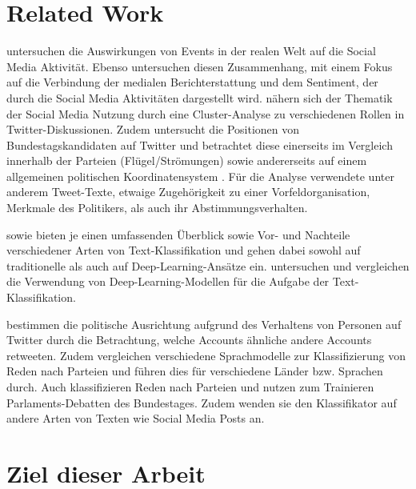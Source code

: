 \section{Related Work}

\textcite{kalyanam_prediction_2016} untersuchen die Auswirkungen von Events in der realen Welt auf die Social Media Aktivität. Ebenso untersuchen \textcite{tsytsarau_dynamics_2014} diesen Zusammenhang, mit einem Fokus auf die Verbindung der medialen Berichterstattung und dem Sentiment, der durch die Social Media Aktivitäten dargestellt wird.
\textcite{gimpel_user_2018} nähern sich der Thematik der Social Media Nutzung durch eine Cluster-Analyse zu verschiedenen Rollen in Twitter-Diskussionen.
Zudem untersucht \textcite{saltzer_bundestagswahl_2022} die Positionen von Bundestagskandidaten auf Twitter und betrachtet diese einerseits im Vergleich innerhalb der Parteien (Flügel/Strömungen) sowie andererseits auf einem allgemeinen politischen Koordinatensystem \autocite{saltzer_bundestagswahl_2022, saltzer_finding_2022}. Für die Analyse verwendete \textcite{saltzer_finding_2022} unter anderem Tweet-Texte, etwaige Zugehörigkeit zu einer Vorfeldorganisation, Merkmale des Politikers, als auch ihr Abstimmungsverhalten.

\textcite{li_survey_2021} sowie \textcite{kowsari_text_2019} bieten je einen umfassenden Überblick sowie Vor- und Nachteile verschiedener Arten von Text-Klassifikation und gehen dabei sowohl auf traditionelle als auch auf Deep-Learning-Ansätze ein.
\textcite{minaee_deep_2022} untersuchen und vergleichen die Verwendung von Deep-Learning-Modellen für die Aufgabe der Text-Klassifikation.

\textcite{wong_quantifying_2016} bestimmen die politische Ausrichtung aufgrund des Verhaltens von Personen auf Twitter durch die Betrachtung, welche Accounts ähnliche andere Accounts retweeten.
Zudem vergleichen \textcite{doan_using_2022} verschiedene Sprachmodelle zur Klassifizierung von Reden nach Parteien und führen dies für verschiedene Länder bzw. Sprachen durch.
Auch \textcite{biessmann_predicting_2016} klassifizieren Reden nach Parteien und nutzen zum Trainieren Parlaments-Debatten des Bundestages. Zudem wenden sie den Klassifikator auf andere Arten von Texten wie Social Media Posts an.

\section{Ziel dieser Arbeit} \label{sec:thesisGoal}

